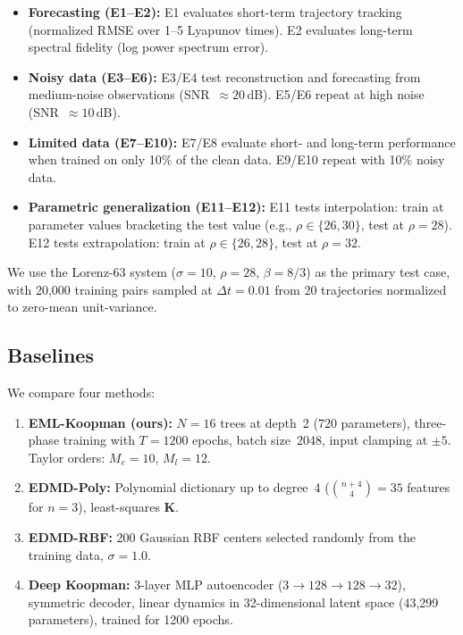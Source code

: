 \documentclass[11pt]{article}
\newcommand{\bK}{\mathbf{K}}
\begin{document}
\begin{itemize}
  \item \textbf{Forecasting (E1--E2):}
    E1 evaluates short-term trajectory tracking (normalized RMSE over
    1--5 Lyapunov times).
    E2 evaluates long-term spectral fidelity (log power spectrum error).

  \item \textbf{Noisy data (E3--E6):}
    E3/E4 test reconstruction and forecasting from medium-noise observations
    (SNR~$\approx 20$\,dB).
    E5/E6 repeat at high noise (SNR~$\approx 10$\,dB).

  \item \textbf{Limited data (E7--E10):}
    E7/E8 evaluate short- and long-term performance when trained on only
    10\% of the clean data.
    E9/E10 repeat with 10\% noisy data.

  \item \textbf{Parametric generalization (E11--E12):}
    E11 tests interpolation: train at parameter values bracketing the test
    value (e.g., $\rho \in \{26, 30\}$, test at $\rho = 28$).
    E12 tests extrapolation: train at $\rho \in \{26, 28\}$, test at
    $\rho = 32$.
\end{itemize}

\noindent
We use the Lorenz-63 system ($\sigma\!=\!10$, $\rho\!=\!28$, $\beta\!=\!8/3$) as
the primary test case, with 20,000 training pairs sampled at $\Delta t = 0.01$
from 20 trajectories normalized to zero-mean unit-variance.


\subsection{Baselines}
\label{sec:baselines}

We compare four methods:

\begin{enumerate}
  \item \textbf{EML-Koopman (ours):} $N\!=\!16$ trees at depth~2 (720
    parameters), three-phase training with $T\!=\!1200$ epochs, batch
    size~2048, input clamping at $\pm 5$.  Taylor orders: $M_e\!=\!10$,
    $M_l\!=\!12$.
  \item \textbf{EDMD-Poly:} Polynomial dictionary up to degree~4
    ($\binom{n+4}{4} = 35$ features for $n\!=\!3$), least-squares $\bK$.
  \item \textbf{EDMD-RBF:} 200 Gaussian RBF centers selected randomly from the
    training data, $\sigma\!=\!1.0$.
  \item \textbf{Deep Koopman:} 3-layer MLP autoencoder ($3 \to 128 \to 128
    \to 32$), symmetric decoder, linear dynamics in 32-dimensional latent
    space (43{,}299 parameters), trained for 1200 epochs.
\end{enumerate}
\end{document}
